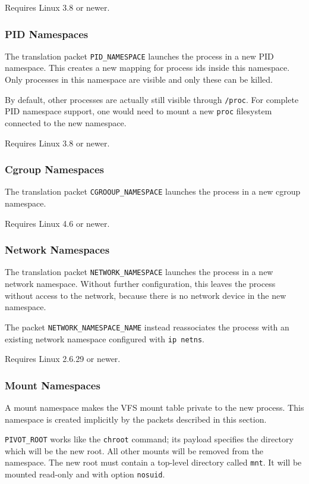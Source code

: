 \documentclass[a4paper,12pt]{article}
\begin{document}
Requires Linux 3.8 or newer.

\subsubsection{PID Namespaces}

The translation packet \verb|PID_NAMESPACE| launches the process in a
new PID namespace.  This creates a new mapping for process ids inside
this namespace.  Only processes in this namespace are visible and only
these can be killed.

By default, other processes are actually still visible through
\texttt{/proc}.  For complete PID namespace support, one would need to
mount a new \texttt{proc} filesystem connected to the new namespace.

Requires Linux 3.8 or newer.

\subsubsection{Cgroup Namespaces}

The translation packet \verb|CGROOUP_NAMESPACE| launches the process
in a new cgroup namespace.

Requires Linux 4.6 or newer.

\subsubsection{Network Namespaces}

The translation packet \verb|NETWORK_NAMESPACE| launches the process
in a new network namespace.  Without further configuration, this
leaves the process without access to the network, because there is no
network device in the new namespace.

The packet \verb|NETWORK_NAMESPACE_NAME| instead reassociates the
process with an existing network namespace configured with
\verb|ip netns|.

Requires Linux 2.6.29 or newer.

\subsubsection{Mount Namespaces}

A mount namespace makes the VFS mount table private to the new
process.  This namespace is created implicitly by the packets
described in this section.

\verb|PIVOT_ROOT| works like the \texttt{chroot} command; its
payload specifies the directory which will be the new root.  All other
mounts will be removed from the namespace.  The new root must contain
a top-level directory called \texttt{mnt}.  It will be mounted
read-only and with option \texttt{nosuid}.
\end{document}
